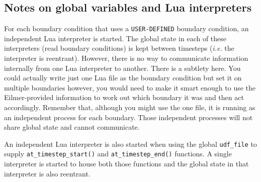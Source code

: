 \subsection{Notes on global variables and Lua interpreters}
%
For each boundary condition that uses a \verb!USER-DEFINED! boundary condition, 
an independent Lua interpreter is started. 
The global state in each of these interpreters (read boundary conditions) 
is kept between timesteps (\textit{i.e.} the interpreter is reentrant). 
However, there is no way to communicate information internally from one Lua interpreter to another. 
There is a subtlety here. 
You could actually write just one Lua file as the boundary condition but set it on multiple boundaries 
however, you would need to make it smart enough to use the Eilmer-provided information to work out 
which boundary it was and then act accordingly. 
Remember that, although you might use the one file, 
it is running as an independent process for each boundary. 
Those independent processes will not share global state and cannot communicate.

\medskip
An independent Lua interpreter is also started when using the global \verb!udf_file! 
to supply \verb!at_timestep_start()! and \verb!at_timestep_end()! functions. 
A single interpreter is started to house both those functions and 
the global state in that interpreter is also reentrant. 
